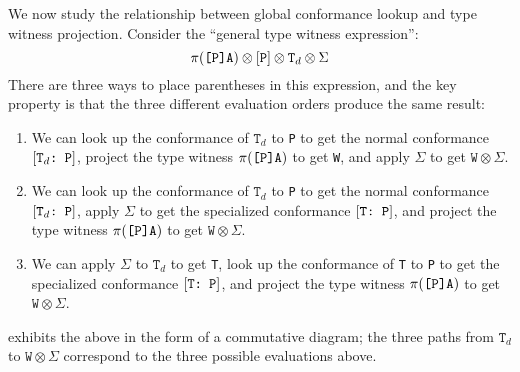\documentclass[../generics]{subfiles}
\begin{document}
We now study the relationship between global conformance lookup and type witness projection. Consider the ``general type witness expression'':
\[\pi(\texttt{[P]A})\otimes[\texttt{P}]\otimes\texttt{T}_d\otimes\Sigma\]
There are three ways to place parentheses in this expression, and the key property is that the three different evaluation orders produce the same result:
\begin{enumerate}
\item We can look up the conformance of $\texttt{T}_d$ to \texttt{P} to get the normal conformance $[\texttt{$\texttt{T}_d$:~P}]$, project the type witness $\pi(\texttt{[P]A})$ to get \texttt{W}, and apply $\Sigma$ to get $\texttt{W}\otimes\Sigma$.
\item We can look up the conformance of $\texttt{T}_d$ to \texttt{P} to get the normal conformance $[\texttt{$\texttt{T}_d$:~P}]$, apply $\Sigma$ to get the specialized conformance $[\texttt{T:~P}]$, and project the type witness $\pi(\texttt{[P]A})$ to get $\texttt{W}\otimes\Sigma$.
\item We can apply $\Sigma$ to $\texttt{T}_d$ to get \texttt{T}, look up the conformance of \texttt{T} to \texttt{P} to get the specialized conformance $[\texttt{T:~P}]$, and project the type witness $\pi(\texttt{[P]A})$ to get $\texttt{W}\otimes\Sigma$.
\end{enumerate}
 exhibits the above in the form of a commutative diagram; the three paths from $\texttt{T}_d$ to $\texttt{W}\otimes\Sigma$ correspond to the three possible evaluations above.

\begin{figure}\label{type witness diagram}
\begin{center}
\end{center}
\end{figure}
\end{document}
